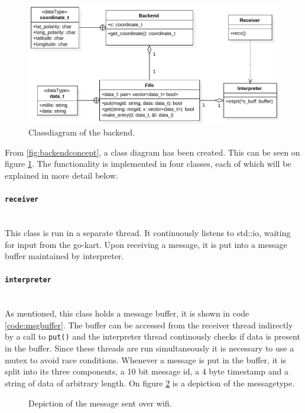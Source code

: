 \begin{figure}[H]
	\includegraphics[width=\linewidth]{graphics/backend_class_diagram}
	\caption[Backend class diagram.]{Classdiagram of the backend.}
	\label{fig:backendclass}
\end{figure}

From \ref{fig:backendconcept}, a class diagram has been created.
This can be seen on figure \ref{fig:backendclass}.
The functionality is implemented in four classes, each of which will be explained in more detail below.

\paragraph*{\texttt{receiver}}~\\
This class is run in a separate thread.
It continuously listens to std::io, waiting for input from the go-kart.
Upon receiving a message, it is put into a message buffer maintained by interpreter.
\paragraph*{\texttt{interpreter}}~\\
As mentioned, this class holds a message buffer, it is shown in code \ref{code:msgbuffer}.
The buffer can be accessed from the receiver thread indirectly by a call to \texttt{put()} and the interpreter thread continously checks if data is present in the buffer.
Since these threads are run simultaneously it is necessary to use a mutex to avoid race conditions.
Whenever a message is put in the buffer, it is split into its three components, a 10 bit message id, a 4 byte timestamp and a string of data of arbitrary length.
On figure \ref{fig:backendmsg} is a depiction of the messagetype.
\begin{figure}[H]
	\caption[Wifi Message.]{Depiction of the message sent over wifi.}
	\label{fig:backendmsg}
\end{figure}

